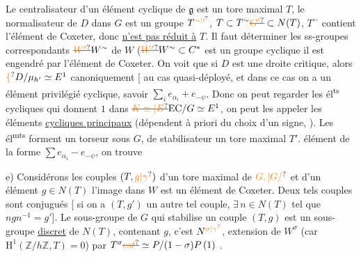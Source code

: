 Le centralisateur d'un élément cyclique de $\mathfrak g$ est un tore maximal $T$,  le normalisateur de $D$ dans $G$ est un groupe $T^{\unsure{\sim|\prime}}$, $T\subset T^{\sim}\deleted{\unsure{G'}}\subset N(T)$, $T^{\sim}$ contient l'élément de Coxeter, donc \uline{n'est pas réduit à} $T$. Il faut  déterminer les ss-groupes correspondants $\deleted{\unsure{W'}} W^{\sim}$ de $W$ ($\deleted{\unsure{W'}}W^{\sim}\subset C^{*}$ est un groupe cyclique   il est engendré par l'élément de Coxeter. On voit que si $D$ est une droite critique, alors $\unsure{\{}D/\mu_{h'}\simeq E^{1}$ canoniquement [ au cas quasi-déployé, et dans ce cas on a un élément privilégié cyclique, savoir $\sum_i e_{\alpha_i}+e_{-\psi}$. Donc on peut regarder les él\textsuperscript{ts} cycliques qui donnent $1$ dans $\deleted{\unsure{K\simeq|E}}\mathrm{EC}/G\simeq E^{1}$, on peut les appeler les éléments \uline{cycliques principaux} (dépendent à priori du choix d'un signe, ). Les él\textsuperscript{mts} forment un torseur sous $G$, de stabilisateur un tore maximal $T'$.  élément de la forme $\sum e_{\alpha_i}-e_{-\psi}$, on trouve

e) Considérons les couples $(T,\unsure{g|\gamma})$ d'un tore maximal de $\unsure{G,|G/}$ et d'un élément $g\in N(T)$  l'image dans $W$ est un élément de Coxeter. Deux tels couples sont conjugués [ si on a $(T,g')$ un autre tel couple, $\exists\,n\in N(T)$ tel que $ngn^{-1}=g'$]. Le sous-groupe de $G$ qui stabilise un couple $(T,g)$ est  un sous-groupe \uline{discret} de $N(T)$, contenant $g$, c'est $N^{\unsure{\sigma|\gamma}}$, extension de $W^{\sigma}$ (car $\mathrm H^1(\mathbb Z/h\mathbb Z,T)=0$) par $T^{\sigma}\deleted{\unsure{est}}\simeq P/(1-\sigma)P\,(1)$ .

